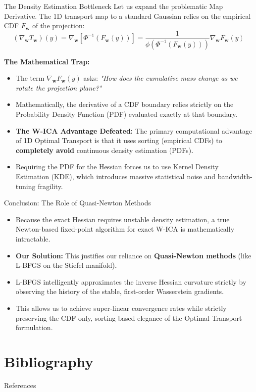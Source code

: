 \documentclass{beamer}
\begin{document}
\begin{frame}{The Density Estimation Bottleneck}
  Let us expand the problematic Map Derivative. The 1D transport map to a standard Gaussian relies on the empirical CDF $F_{\mathbf{w}}$ of the projection:
  \[ (\nabla_{\mathbf{w}} T_{\mathbf{w}})(y) = \nabla_{\mathbf{w}} \left[ \Phi^{-1}(F_{\mathbf{w}}(y)) \right] = \frac{1}{\phi(\Phi^{-1}(F_{\mathbf{w}}(y)))} \nabla_{\mathbf{w}} F_{\mathbf{w}}(y) \]
  
  \textbf{The Mathematical Trap:}
  \begin{itemize}
    \item The term $\nabla_{\mathbf{w}} F_{\mathbf{w}}(y)$ asks: \textit{"How does the cumulative mass change as we rotate the projection plane?"}
    \item Mathematically, the derivative of a CDF boundary relies strictly on the Probability Density Function (PDF) evaluated exactly at that boundary.
    \item \textbf{The W-ICA Advantage Defeated:} The primary computational advantage of 1D Optimal Transport is that it uses sorting (empirical CDFs) to \textbf{completely avoid} continuous density estimation (PDFs).
    \item Requiring the PDF for the Hessian forces us to use Kernel Density Estimation (KDE), which introduces massive statistical noise and bandwidth-tuning fragility.
  \end{itemize}
\end{frame}

\begin{frame}{Conclusion: The Role of Quasi-Newton Methods}
  \begin{itemize}
    \item Because the exact Hessian requires unstable density estimation, a true Newton-based fixed-point algorithm for exact W-ICA is mathematically intractable.
    \item \textbf{Our Solution:} This justifies our reliance on \textbf{Quasi-Newton methods} (like L-BFGS on the Stiefel manifold).
    \item L-BFGS intelligently approximates the inverse Hessian curvature strictly by observing the history of the stable, first-order Wasserstein gradients.
    \item This allows us to achieve super-linear convergence rates while strictly preserving the CDF-only, sorting-based elegance of the Optimal Transport formulation.
  \end{itemize}
\end{frame}


\section{Bibliography}

\begin{frame}[allowframebreaks]{References}

\end{frame}
\end{document}
